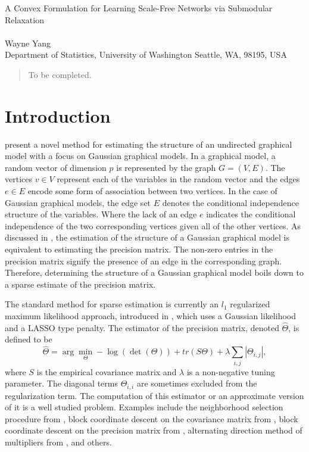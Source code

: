 \documentclass{uwstat572}
\theoremstyle{remark}
\theoremstyle{definition}
\begin{document}

\begin{center}
  {\LARGE A Convex Formulation for Learning Scale-Free Networks via Submodular Relaxation}\\\ \\
  {Wayne Yang \\ 
    Department of Statistics, University of Washington Seattle, WA, 98195, USA
  }
\end{center}



\begin{abstract}
  To be completed.
\end{abstract}

\section{Introduction}
\citet{Defazio2012} present a novel method for estimating the structure of an undirected graphical model with a focus on Gaussian graphical models. In a graphical model, a random vector of dimension $p$ is represented by the graph $G = (V,E)$.  The vertices $v \in V$ represent each of the variables in the random vector and the edges $e \in E$ encode some form of association between two vertices. In the case of Gaussian graphical models, the edge set $E$ denotes the conditional independence structure of the variables.  Where the lack of an edge $e$ indicates the conditional independence of the two corresponding vertices given all of the other vertices.  As discussed in \cite{dempster}, the estimation of the structure of a Gaussian graphical model is equivalent to estimating the precision matrix.  The non-zero entries in the precision matrix signify the presence of an edge in the corresponding graph.  Therefore, determining the structure of a Gaussian graphical model boils down to a sparse estimate of the precision matrix.

The standard method for sparse estimation is currently an $l_1$ regularized maximum likelihood approach, introduced in \cite{Yuan2007}, which uses a Gaussian likelihood and a LASSO type penalty.  The estimator of the precision matrix, denoted $\widehat{\Theta}$, is defined to be
\begin{equation*}
    \widehat{\Theta} = \arg\min_{\Theta} -\log( \det( \Theta)) + tr(S \Theta) + \lambda \sum_{i, j} |\Theta_{i,j}|,
\end{equation*}
where $S$ is the empirical covariance matrix and $\lambda$ is a non-negative tuning parameter. The diagonal terms $\Theta_{i,i}$ are sometimes excluded from the regularization term. The computation of this estimator or an approximate version of it is a well studied problem.  Examples include the neighborhood selection procedure from \cite{meinshausen2006}, block coordinate descent on the covariance matrix from \cite{Banerjee2008}, block coordinate descent on the precision matrix from \cite{Friedman2008}, alternating direction method of multipliers from \cite{Boyd2011}, and others.
\end{document}
